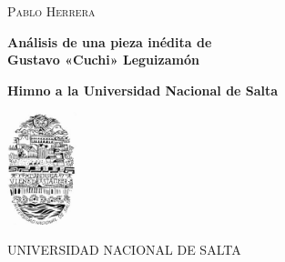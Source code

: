 \begin{center}
\vspace{2cm}

\textsc{Pablo Herrera}

\vspace{4cm}

\textbf{\LARGE Análisis de una pieza inédita de\\ Gustavo «Cuchi» Leguizamón}

\vspace{1cm}

\textbf{\large Himno a la Universidad Nacional de Salta}

\vspace{3cm}

\includegraphics[width=2cm]{img/escudo_unsa}

UNIVERSIDAD NACIONAL DE SALTA
\end{center}
